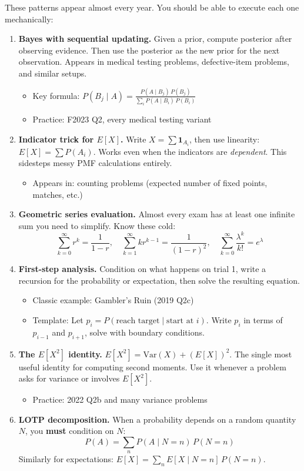 \documentclass[11pt]{article}
\begin{document}
These patterns appear almost every year. You should be able to execute each one mechanically:

\begin{enumerate}[label=\textbf{\arabic*.}]

\item \textbf{Bayes with sequential updating.} Given a prior, compute posterior after observing evidence. Then use the posterior as the new prior for the next observation. Appears in medical testing problems, defective-item problems, and similar setups.
\begin{itemize}
\item Key formula: $P(B_j \mid A) = \frac{P(A \mid B_j)\,P(B_j)}{\sum_i P(A \mid B_i)\,P(B_i)}$
\item Practice: F2023 Q2, every medical testing variant
\end{itemize}

\item \textbf{Indicator trick for $E[X]$.} Write $X = \sum \mathbf{1}_{A_i}$, then use linearity: $E[X] = \sum P(A_i)$. Works even when the indicators are \emph{dependent}. This sidesteps messy PMF calculations entirely.
\begin{itemize}
\item Appears in: counting problems (expected number of fixed points, matches, etc.)
\end{itemize}

\item \textbf{Geometric series evaluation.} Almost every exam has at least one infinite sum you need to simplify. Know these cold:
\[
\sum_{k=0}^{\infty} r^k = \frac{1}{1-r}, \quad \sum_{k=1}^{\infty} k r^{k-1} = \frac{1}{(1-r)^2}, \quad \sum_{k=0}^{\infty} \frac{\lambda^k}{k!} = e^{\lambda}
\]

\item \textbf{First-step analysis.} Condition on what happens on trial 1, write a recursion for the probability or expectation, then solve the resulting equation.
\begin{itemize}
\item Classic example: Gambler's Ruin (2019 Q2c)
\item Template: Let $p_i = P(\text{reach target} \mid \text{start at } i)$. Write $p_i$ in terms of $p_{i-1}$ and $p_{i+1}$, solve with boundary conditions.
\end{itemize}

\item \textbf{The $E[X^2]$ identity.} $E[X^2] = \text{Var}(X) + (E[X])^2$. The single most useful identity for computing second moments. Use it whenever a problem asks for variance or involves $E[X^2]$.
\begin{itemize}
\item Practice: 2022 Q2b and many variance problems
\end{itemize}

\item \textbf{LOTP decomposition.} When a probability depends on a random quantity $N$, you \textbf{must} condition on $N$:
\[
P(A) = \sum_n P(A \mid N=n)\,P(N=n)
\]
Similarly for expectations: $E[X] = \sum_n E[X \mid N=n]\,P(N=n)$.

\end{enumerate}
\end{document}
